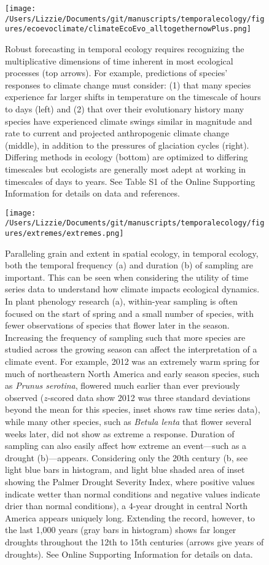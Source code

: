 \documentclass[11pt,a4paper,oneside]{article}
\begin{document}
\newpage
\begin{figure}[h!]
\centering
\noindent \texttt{[image: /Users/Lizzie/Documents/git/manuscripts/temporalecology/figures/ecoevoclimate/climateEcoEvo\_alltogethernowPlus.png]}
\caption{Robust forecasting in temporal ecology requires recognizing the multiplicative dimensions of time inherent in most ecological processes (top arrows). For example, predictions of species' responses to climate change must consider: (1) that many species experience far larger shifts in temperature on the timescale of hours to days (left) and (2) that over their evolutionary history many species have experienced climate swings similar in magnitude and rate to current and projected anthropogenic climate change (middle), in addition to the pressures of glaciation cycles (right). Differing methods in ecology (bottom) are optimized to differing timescales but ecologists are generally most adept at working in timescales of days to years. See Table S1 of the Online Supporting Information for details on data and references.}
\end{figure}


\newpage
\begin{figure}[h!]
\centering
\noindent \texttt{[image: /Users/Lizzie/Documents/git/manuscripts/temporalecology/figures/extremes/extremes.png]}
\caption{Paralleling grain and extent in spatial ecology, in temporal ecology, both the temporal frequency (a) and duration (b) of sampling are important. This can be seen when considering the utility of time series data to understand how climate impacts ecological dynamics. In plant phenology research (a), within-year sampling is often focused on the start of spring and a small number of species, with fewer observations of species that flower later in the season. Increasing the frequency of sampling such that more species are studied across the growing season can affect the interpretation of a climate event. For example, 2012 was an extremely warm spring for much of northeastern North America and early season species, such as \emph{Prunus serotina}, flowered much earlier than ever previously observed ($z$-scored data show 2012 was three standard deviations beyond the mean for this species, inset shows raw time series data), while many other species, such as \emph{Betula lenta} that flower several weeks later, did not show as extreme a response. Duration of sampling can also easily affect how extreme an event---such as a drought (b)---appears. Considering only the 20th century (b, see light blue bars in histogram, and light blue shaded area of inset showing the Palmer Drought Severity Index, where positive values indicate wetter than normal conditions and negative values indicate drier than normal conditions), a 4-year drought in central North America appears uniquely long. Extending the record, however, to the last 1,000 years (gray bars in histogram) shows far longer droughts throughout the 12th to 15th centuries (arrows give years of droughts). See Online Supporting Information for details on data.}
\end{figure}
\end{document}

